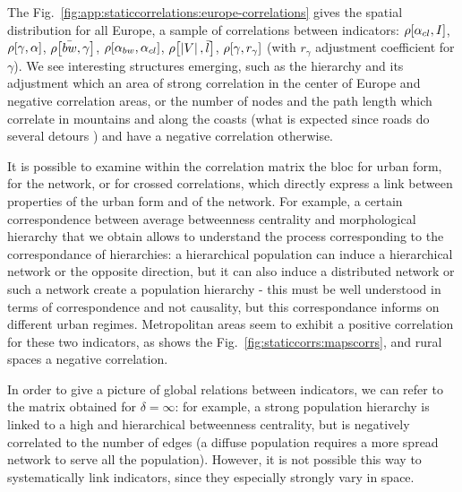 The Fig.~\ref{fig:app:staticcorrelations:europe-correlations} gives the spatial distribution for all Europe,  a sample of correlations between indicators: $\rho\!\left[\alpha_{cl},I\right]$, $\rho\!\left[\gamma,\alpha\right]$, $\rho\!\left[\bar{bw},\gamma\right]$, $\rho\!\left[\alpha_{bw},\alpha_{cl}\right]$, $\rho\!\left[\left|V\right|,\bar{l}\right]$, $\rho\!\left[\gamma,r_{\gamma}\right]$ (with $r_{\gamma}$ adjustment coefficient for $\gamma$). We see interesting structures emerging, such as the hierarchy and its adjustment which  an area of strong correlation in the center of Europe and negative correlation areas, or the number of nodes and the path length which correlate in mountains and along the coasts (what is expected since roads  do several detours ) and have a negative correlation otherwise.




It is possible to examine within the correlation matrix the bloc for urban form, for the network, or for crossed correlations, which directly express a link between properties of the urban form and of the network. For example, a certain correspondence between average betweenness centrality and morphological hierarchy that we obtain allows to understand the process corresponding to the correspondance of hierarchies: a hierarchical population can induce a hierarchical network or the opposite direction, but it can also induce a distributed network or such a network create a population hierarchy - this must be well understood in terms of correspondence and not causality, but this correspondance informs on different urban regimes. Metropolitan areas seem to exhibit a positive correlation for these two indicators, as shows the Fig.~\ref{fig:staticcorrs:mapscorrs}, and rural spaces a negative correlation.


In order to give a picture of global relations between indicators, we can refer to the matrix obtained for $\delta = \infty$: for example, a strong population hierarchy is linked to a high and hierarchical betweenness centrality, but is negatively correlated to the number of edges (a diffuse population requires a more spread network to serve all the population). However, it is not possible this way to systematically link indicators, since they especially strongly vary in space. 


